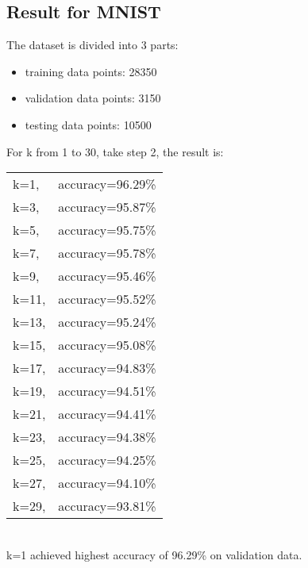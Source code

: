 \documentclass{article}
\begin{document}
\subsection{Result for MNIST}
The dataset is divided into 3 parts:
\begin{itemize}
\item training data points: 28350
\item validation data points: 3150
\item testing data points: 10500
\end{itemize}

For k from 1 to 30, take step 2, the result is:\\
\begin{tabular}{lr}
k=1, &accuracy=96.29\%\\
k=3, &accuracy=95.87\%\\
k=5, &accuracy=95.75\%\\
k=7, &accuracy=95.78\%\\
k=9, &accuracy=95.46\%\\
k=11,&accuracy=95.52\%\\
k=13, &accuracy=95.24\%\\
k=15, &accuracy=95.08\%\\
k=17, &accuracy=94.83\%\\
k=19, &accuracy=94.51\%\\
k=21, &accuracy=94.41\%\\
k=23, &accuracy=94.38\%\\
k=25, &accuracy=94.25\%\\
k=27, &accuracy=94.10\%\\
k=29, &accuracy=93.81\%
\end{tabular}\\
k=1 achieved highest accuracy of 96.29\% on validation data.\\
\end{document}
